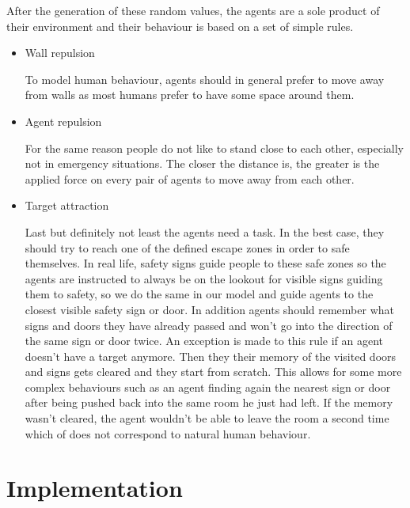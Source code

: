 \documentclass[11pt]{article}
\begin{document}
After the generation of these random values, the agents are a sole product of their environment and their behaviour is based on a set of simple rules.

\begin{itemize}
    \item Wall repulsion
    
    To model human behaviour, agents should in general prefer to move away from walls as most humans prefer to have some space around them.

    \item Agent repulsion
    
    For the same reason people do not like to stand close to each other, especially not in emergency situations. The closer the distance is, the greater is the applied force on every pair of agents to move away from each other.

%    

    \item Target attraction
    
    Last but definitely not least the agents need a task. In the best case, they should try to reach one of the defined escape zones in order to safe themselves. In real life, safety signs guide people to these safe zones so the agents are instructed to always be on the lookout for visible signs guiding them to safety, so we do the same in our model and guide agents to the closest visible safety sign or door. In addition agents should remember what signs and doors they have already passed and won't go into the direction of the same sign or door twice. An exception is made to this rule if an agent doesn't have a target anymore. Then they their memory of the visited doors and signs gets cleared and they start from scratch. This allows for some more complex behaviours such as an agent finding again the nearest sign or door after being pushed back into the same room he just had left. If the memory wasn't cleared, the agent wouldn't be able to leave the room a second time which of does not correspond to natural human behaviour.
\end{itemize}

\section{Implementation}
\end{document}
